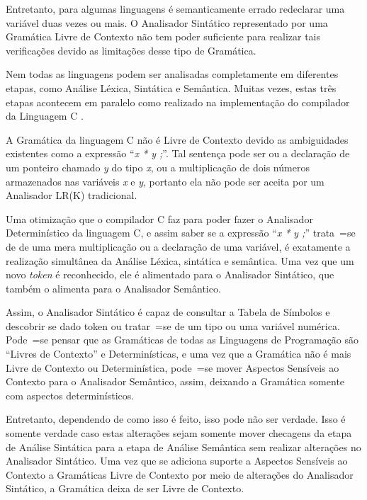 {    Entretanto,
    para algumas linguagens é semanticamente errado redeclarar uma variável duas vezes ou
    mais.
    O Analisador Sintático representado por uma Gramática Livre de Contexto não tem poder suficiente para realizar tais verificações devido as limitações desse tipo de Gramática.

    Nem todas as linguagens podem ser analisadas completamente em diferentes etapas,
    como Análise Léxica, Sintática e Semântica. Muitas vezes,
    estas três etapas acontecem em paralelo como realizado na implementação do compilador da Linguagem C \cite{jourdan2017,whyCcannotBeParsedWithALR1Parser}.

    A Gramática da linguagem C não é Livre de Contexto devido as ambiguidades existentes como a expressão ``\textit{x * y ;}''.
    Tal sentença pode ser ou
    a declaração de um ponteiro chamado \textit{y} do tipo \textit{x},
    ou a multiplicação de dois números armazenados nas variáveis \textit{x} e
    \textit{y},
    portanto ela não pode ser aceita por um Analisador LR(K) tradicional.

    Uma otimização que o compilador C faz para poder fazer o Analisador Determinístico da linguagem C,
    e assim saber se a expressão ``\textit{x * y ;}'' trata~=se de de uma mera multiplicação ou
    a declaração de uma variável,
    é exatamente a realização simultânea da Análise Léxica,
    sintática e
    semântica.
    Uma vez que um novo \textit{token} é reconhecido,
    ele é alimentado para o Analisador Sintático,
    que também o alimenta para o Analisador Semântico.

    Assim,
    o Analisador Sintático é capaz de consultar a Tabela de Símbolos \cite{ahoCompilerDragonBook} e
    descobrir se dado token ou
    tratar~=se de um tipo ou
    uma variável numérica.
    Pode~=se pensar que as Gramáticas de todas as Linguagens de Programação são ``Livres de Contexto'' e
    Determinísticas,
    e uma vez que a Gramática não é mais Livre de Contexto ou
    Determinística,
    pode~=se mover Aspectos Sensíveis ao Contexto para o Analisador Semântico,
    assim,
    deixando a Gramática somente com aspectos determinísticos.

    Entretanto,
    dependendo de como isso é feito,
    isso pode não ser verdade.
    Isso é somente verdade caso estas alterações sejam somente mover checagens da etapa de Análise Sintática para a etapa de Análise Semântica sem realizar alterações no Analisador Sintático.
    Uma vez que se adiciona suporte a Aspectos Sensíveis ao Contexto \cite{contextSensitiveParsing} a Gramáticas Livre de Contexto por meio de alterações do Analisador Sintático,
    a Gramática deixa de ser Livre de Contexto.

}
